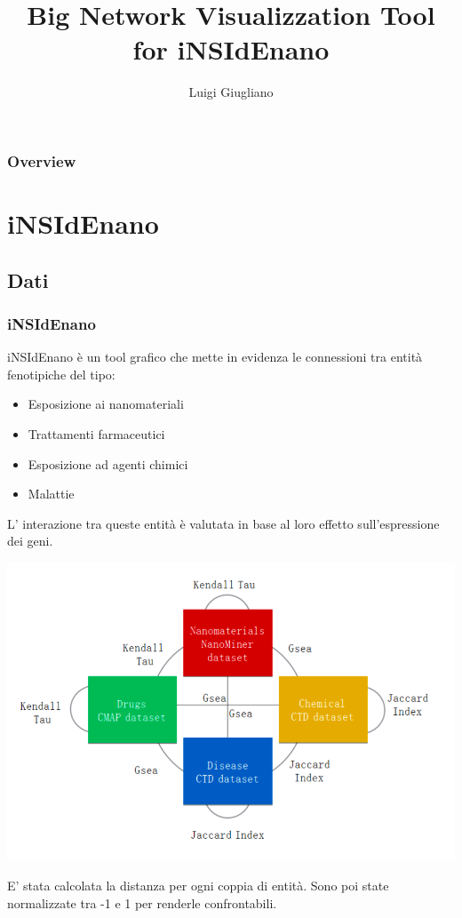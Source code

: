 \documentclass{beamer}
\title{Big Network Visualizzation Tool for iNSIdEnano}
\author{Luigi Giugliano}
\institute{Universit\'a degli studi di Salerno}
\begin{document}
\begin{frame}
   \maketitle
\end{frame}

\begin{frame}
  \frametitle{Overview}
  \footnotesize \tableofcontents
\end{frame}



\section{iNSIdEnano}
\subsection{Dati}
\begin{frame}
\frametitle{iNSIdEnano}
iNSIdEnano è un tool grafico che mette in evidenza le connessioni tra entità fenotipiche del tipo:
\begin{itemize}
\item Esposizione ai nanomateriali
\item Trattamenti farmaceutici
\item Esposizione ad agenti chimici
\item Malattie
\end{itemize}
L' interazione tra queste entità è valutata in base al loro effetto sull'espressione dei geni.
\end{frame}

\begin{frame}
\begin{center}
\includegraphics[scale=0.27]{img/OverviewGraph.png}
\end{center}
E' stata calcolata la distanza per ogni coppia di entità. Sono poi state normalizzate tra -1 e 1 per renderle confrontabili.
\end{frame}
\end{document}
